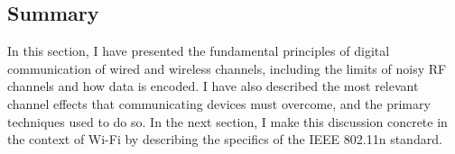 




\subsection{Summary}
\label{sec:background_80211n}
In this section, I have presented the fundamental principles of digital communication of wired and wireless channels, including the limits of noisy RF channels and how data is encoded. I have also described the most relevant channel effects that communicating devices must overcome, and the primary techniques used to do so. In the next section, I make this discussion concrete in the context of Wi-Fi by describing the specifics of the IEEE 802.11n standard. 

